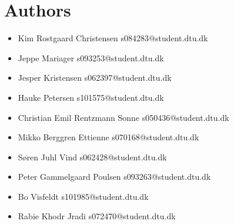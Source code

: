 \documentclass{acm_proc_article-sp}
\begin{document}
\section{Authors}
\label{app:authors}
\begin{itemize}
\item Kim Rostgaard Christensen  s084283@student.dtu.dk
\item Jeppe Mariager s093253@student.dtu.dk
\item Jesper Kristensen s062397@student.dtu.dk
\item Hauke Petersen s101575@student.dtu.dk
\item Christian Emil Rentzmann Sonne s050436@student.dtu.dk
\item Mikko Berggren Ettienne s070168@student.dtu.dk
\item Søren Juhl Vind s062428@student.dtu.dk
\item Peter Gammelgaard Poulsen s093263@student.dtu.dk
\item Bo Visfeldt s101985@student.dtu.dk
\item Rabie Khodr Jradi s072470@student.dtu.dk
\end{itemize}



%
%


\end{document}
